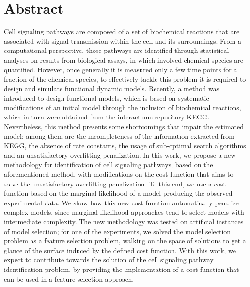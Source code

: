 \documentclass[12pt, twoside]{report}
\numberwithin{mydefinition}{section}
\numberwithin{mytheorem}{section}
\numberwithin{mylemma}{section}
\numberwithin{corollary}{section}
\begin{document}
\chapter*{Abstract}
Cell signaling pathways are composed of a set of biochemical reactions 
that are associated with signal transmission within the cell and its 
surroundings. From a computational perspective, those pathways are 
identified through statistical analyses on results from biological 
assays, in which involved chemical species are quantified. However, once
generally it is measured only a few time points for a fraction of the 
chemical species, to effectively tackle this problem it is required to 
design and simulate functional dynamic models. Recently, a method was 
introduced to design functional models, which is based on systematic modifications of 
an initial model through the inclusion of biochemical reactions, which 
in turn were obtained from the interactome repository KEGG. 
Nevertheless, this method presents some shortcomings that impair the 
estimated model; among them are the incompleteness of the information 
extracted from KEGG, the absence of rate constants, the usage of 
sub-optimal search algorithms and an unsatisfactory overfitting 
penalization. In this work, we propose a new methodology for 
identification of cell signaling pathways, based on the aforementioned
method, with modifications on the cost function that aims to solve the
unsatisfactory overfitting penalization. To this end, we use a cost function
based on the marginal likelihood of a model producing the observed
experimental data. We show how this new cost function 
automatically penalize complex models, since marginal likelihood 
approaches tend to select models with intermediate complexity. The new 
methodology was tested on artificial instances of model selection; for 
one of the experiments, we solved the model selection problem as a 
feature selection problem, walking on the space of solutions to get a 
glance of the surface induced by the defined cost function. With this
work, we expect to contribute towards the solution of the cell 
signaling pathway identification problem, by providing the implementation of a cost function that
can be used in a feature selection approach.
\end{document}

